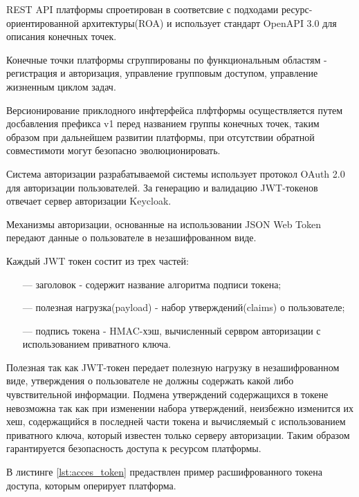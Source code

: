 REST API платформы спроетирован в соответсвие с подходами ресурс-ориентированной архитектуры(ROA)\cite{guinard2011internet} и использует стандарт OpenAPI 3.0 для описания конечных точек.

Конечные точки платформы сгруппированы по функциональным областям - регистрация и авторизация, управление групповым доступом, управление жизненным циклом задач.

Версионирование приклодного инфтерфейса плфтформы осуществляется путем досбавления префикса v1 перед названием группы конечных точек, таким образом при дальнейшем развитии платформы, при отсутствии обратной совместимоти могут безопасно эволюционировать.

Система авторизации разрабатываемой системы использует протокол OAuth 2.0\cite{boyd2012getting} для авторизации пользователей.
За генерацию и валидацию JWT-токенов\cite{ahmed2019authentication} отвечает сервер авторизации Keycloak.

Механизмы авторизации, основанные на использовании JSON Web Token передают данные о пользователе в незашифрованном виде.

Каждый JWT токен состит из трех частей:

\begin{itemize}
  \item[---] заголовок - содержит название алгоритма подписи токена;
  \item[---] полезная нагрузка(payload) - набор утверждений(claims) о пользователе;
  \item[---] подпись токена - HMAC-хэш, вычисленный сервром авторизации с использованием приватного ключа.
\end{itemize}

Полезная так как JWT-токен передает полезную нагрузку в незашифрованном виде, утверждения о пользователе не должны содержать какой либо чувствительной информации.
Подмена утверждений содержащихся в токене невозможна так как при изменении набора утверждений, неизбежно изменится их хеш, содержащийся в последней части токена и вычисляемый с использованием приватного ключа, который известен только серверу авторизации. Таким образом гарантируется безопасность доступа к ресурсом платформы.

В листинге \ref{lst:acces_token} предаствлен пример расшифрованного токена доступа, которым оперирует платформа.

